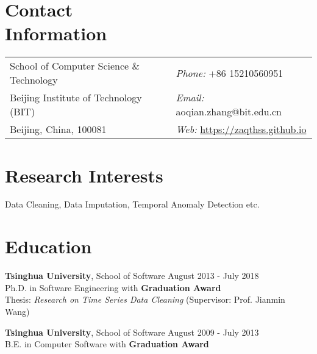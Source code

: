 \documentclass[margin]{cv}
\begin{document}
\begin{resume}
\section{\sc Contact\\ Information}
\vspace{.05in}
\begin{tabular}{@{}p{3.8in}p{3.2in}}
School of Computer Science \& Technology & {\it Phone:}  +86 15210560951 \\            
Beijing Institute of Technology (BIT)   & {\it Email:}  aoqian.zhang@bit.edu.cn \\
Beijing, China, 100081 & {\it Web:}  \url{https://zaqthss.github.io}\\

\end{tabular}


\section{\sc Research Interests}

Data Cleaning, Data Imputation, Temporal Anomaly Detection etc.

\section{\sc Education}
{\bf Tsinghua University}, School of Software  \hfill August 2013 - July 2018 \\
Ph.D. in Software Engineering \hfill with \textbf{Graduation Award} \\
Thesis: {\it Research on Time Series Data Cleaning} (Supervisor: Prof. Jianmin Wang)

{\bf Tsinghua University}, School of Software \hfill August 2009 - July 2013 \\
B.E. in Computer Software \hfill with \textbf{Graduation Award} \\


\end{resume}
\end{document}
